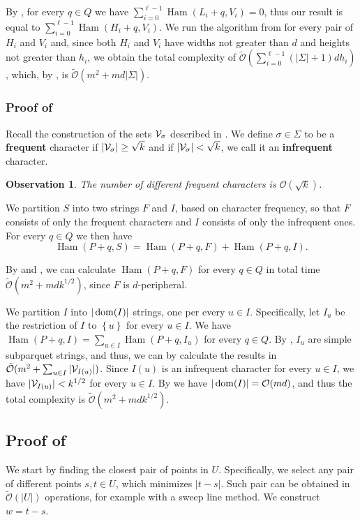 \documentclass[11pt]{article}
\renewcommand{\O}{\mathcal{O}}
\newcommand{\tO}{\tilde{\mathcal{O}}}
\newcommand{\set}[1]{\left\lbrace #1 \right\rbrace}
\theoremstyle{plain}
\newtheorem{observation}{Observation}
\theoremstyle{definition}
\theoremstyle{remark}
\DeclareMathOperator*{\Ham}{Ham}
\begin{document}
By , for every $q \in Q$ we have $\sum_{i = 0}^{\ell - 1} \Ham(L_i + q, V_i) = 0$, thus our result is equal to $\sum_{i = 0}^{\ell - 1} \Ham(H_i + q, V_i)$.
We run the algorithm from  for every pair of $H_i$ and $V_i$ and, since both $H_i$ and $V_i$ have widths not greater than $d$ and heights not greater than $h_i$, we obtain the total complexity of $\tO(\sum_{i = 0}^{\ell - 1} (|\Sigma| + 1)dh_i)$, 
which, by , is $\tO(m^2 + md|\Sigma|)$.

\subsubsection{Proof of } \label{dense_algo_proof}

Recall the construction of the sets $\mathcal{V}_\sigma$ described in .
We define $\sigma \in \Sigma$ to be a \textbf{frequent} character if $|\mathcal{V}_\sigma| \ge \sqrt{k}$ and if $|\mathcal{V}_\sigma| < \sqrt{k}$, we call it an \textbf{infrequent} character.
\begin{observation}\label{frequent_character_bound}
	The number of different frequent characters is $\O(\sqrt{k})$.
\end{observation}


We partition $S$ into two strings $F$ and $I$, based on character frequency,
so that $F$ consists of only the frequent characters and $I$ consists of only the infrequent ones.
For every $q \in Q$ we then have 
$$\Ham(P + q, S) = \Ham(P + q, F) + \Ham(P + q, I).$$

By  and , we can calculate $\Ham(P + q, F)$ for every $q \in Q$ in total time $\tO(m^2 + mdk^{1/2})$, since $F$ is $d$-peripheral. 

We partition $I$ into $|\operatorname*{dom}(I)|$ strings, one per every $u \in I$.
Specifically, let $I_u$ be the restriction of $I$ to $\set{u}$ for every $u \in I$.
We have $\Ham(P + q, I) = \sum_{u \in I} \Ham(P + q, I_u)$ for every $q \in Q$.
By , $I_u$ are simple subparquet strings, and thus, we can by  calculate the results in $\tO(m^2 + \sum_{u \in I} |\V_{I(u)}|)$.
Since $I(u)$ is an infrequent character for every $u \in I$, we have $|\mathcal{V}_{I(u)}| < k^{1/2}$ for every $u \in I$.
By  we have $|\d{I}| = \O(md)$, and thus the total complexity is $\tO(m^2 + mdk^{1/2})$.

\subsection{Proof of } \label{get_periods_proof}
We start by finding the closest pair of points in $U$.
Specifically, we select any pair of different points $s, t \in U$, which minimizes $|t - s|$. 
Such pair can be obtained in $\tO(|U|)$ operations, for example with a sweep line method.
We construct $w = t - s$.
\end{document}
